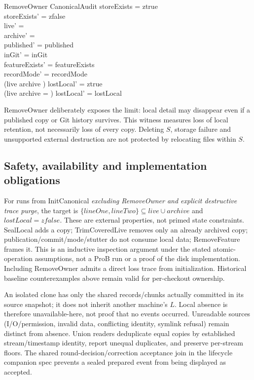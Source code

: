 \documentclass[a4paper,10pt,fleqn]{article}
\begin{document}
\begin{schema}{RemoveOwner}
\Delta CanonicalAudit
\where
storeExists = ztrue \\
storeExists' = zfalse \\
live' = \emptyset \\
archive' = \emptyset \\
published' = published \\
inGit' = inGit \\
featureExists' = featureExists \\
recordMode' = recordMode \\
(live \cup archive \neq \emptyset) \implies lostLocal' = ztrue \\
(live \cup archive = \emptyset) \implies lostLocal' = lostLocal
\end{schema}

RemoveOwner deliberately exposes the limit: local detail may disappear
even if a published copy or Git history survives. This witness measures
loss of local retention, not necessarily loss of every copy. Deleting
$S$, storage failure and unsupported external destruction are not
protected by relocating files within $S$.

\subsection{Safety, availability and implementation obligations}

For runs from InitCanonical \emph{excluding RemoveOwner and explicit
destructive trace purge}, the target is
$\{lineOne,lineTwo\} \subseteq live \cup archive$ and
$lostLocal = zfalse$. These are external properties, not primed state
constraints. SealLocal adds a copy; TrimCoveredLive removes only an
already archived copy; publication/commit/mode/stutter do not consume
local data; RemoveFeature frames it. This is an inductive inspection
argument under the stated atomic-operation assumptions, not a ProB
run or a proof of the disk implementation. Including RemoveOwner
admits a direct loss trace from initialization. Historical baseline
counterexamples above remain valid for per-checkout ownership.

An isolated clone has only the shared records/chunks actually committed
in its source snapshot; it does not inherit another machine's $L$.
Local absence is therefore unavailable-here, not proof that no events
occurred. Unreadable sources (I/O/permission, invalid data, conflicting
identity, symlink refusal) remain distinct from absence. Union readers
deduplicate equal copies by established stream/timestamp identity,
report unequal duplicates, and preserve per-stream floors. The shared
round-decision/correction acceptance join in the lifecycle companion
spec prevents a sealed prepared event from being displayed as accepted.
\end{document}
